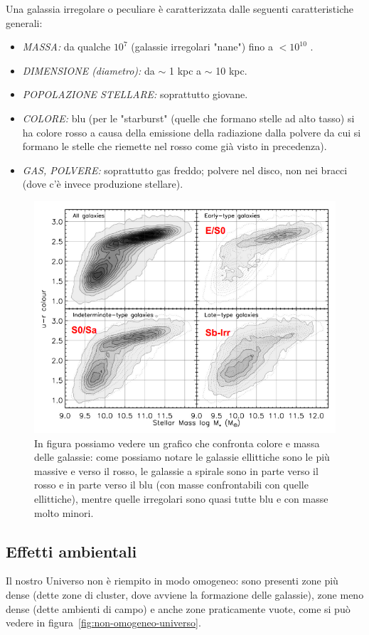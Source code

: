 Una galassia irregolare o peculiare è caratterizzata dalle seguenti caratteristiche generali:

\begin{itemize}
	\item \emph{MASSA:} da qualche $10^7$ \unit{\solarmass{}} (galassie irregolari "nane") fino a $< 10^{10}$ \unit{\solarmass{}}.
	\item \emph{DIMENSIONE (diametro):} da $\sim$ 1 kpc a $\sim$ 10 kpc.
	\item \emph{POPOLAZIONE STELLARE:} soprattutto giovane.
	\item \emph{COLORE:} blu (per le "starburst" (quelle che formano stelle ad alto tasso) si ha colore rosso a causa della emissione della radiazione dalla polvere da cui si formano le stelle che riemette nel rosso come già visto in precedenza).
	\item \emph{GAS, POLVERE:} soprattutto gas freddo; polvere nel disco, non nei bracci (dove c'è invece produzione stellare).
\end{itemize}

\begin{figure}
	\centering
	\includegraphics[width = 0.6 \textwidth ]{immagini/galassie-colore-massa-stellare.png}
	\caption{In figura possiamo vedere un grafico che confronta colore e massa delle galassie: come possiamo notare le galassie ellittiche sono le più massive e verso il rosso, le galassie a spirale sono in parte verso il rosso e in parte verso il blu (con masse confrontabili con quelle ellittiche), mentre quelle irregolari sono quasi tutte blu e con masse molto minori.}
	\label{fig:galassie-colore-massastellare}
\end{figure}
\subsection{Effetti ambientali}
Il nostro Universo non è riempito in modo omogeneo: sono presenti zone più dense (dette zone di cluster, dove avviene la formazione delle galassie), zone meno dense (dette ambienti di campo) e anche zone praticamente vuote, come si può vedere in figura~\ref{fig:non-omogeneo-universo}.

